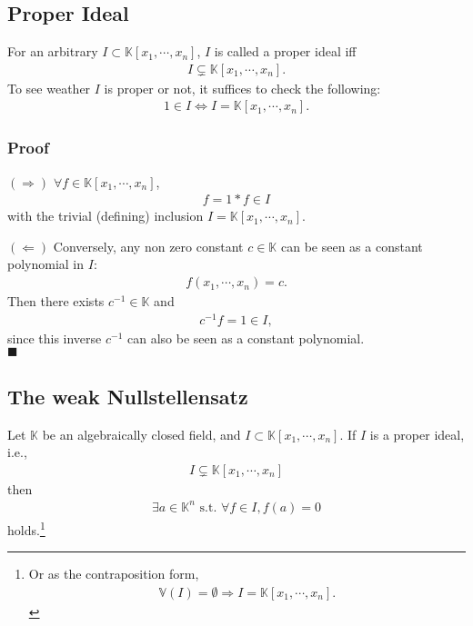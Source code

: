 \documentclass[11pt]{book}
\begin{document}
\subsection{Proper Ideal}
For an arbitrary $I \subset \mathbb{K}[x_1, \cdots, x_n]$, $I$ is called a proper ideal iff 
\begin{eqnarray}
I \subsetneq \mathbb{K}[x_1, \cdots, x_n].
\end{eqnarray}
To see weather $I$ is proper or not, it suffices to check the following:
\begin{eqnarray}
1 \in I \Leftrightarrow I = \mathbb{K}[x_1, \cdots, x_n].
\end{eqnarray}

\subsubsection{Proof}
$(\Rightarrow)$ $\forall f \in \mathbb{K}[x_1, \cdots, x_n]$,
\begin{eqnarray}
f = 1*f \in I
\end{eqnarray}
with the trivial (defining) inclusion $I = \mathbb{K}[x_1, \cdots, x_n]$.

$(\Leftarrow)$ Conversely, any non zero constant $c \in \mathbb{K}$ can be seen as a constant polynomial in $I$:
\begin{eqnarray}
f(x_1, \cdots, x_n) = c.
\end{eqnarray}
Then there exists $c^{-1} \in \mathbb{K}$ and
\begin{eqnarray}
c^{-1} f = 1 \in I,
\end{eqnarray}
since this inverse $c^{-1}$ can also be seen as a constant polynomial.\\
$\blacksquare$

\subsection{The weak Nullstellensatz}
Let $\mathbb{K}$ be an algebraically closed field, and $I \subset \mathbb{K}[x_1, \cdots, x_n]$.
If $I$ is a proper ideal, i.e.,
\begin{eqnarray}
I \subsetneq \mathbb{K}[x_1, \cdots, x_n]
\end{eqnarray}
then
\begin{eqnarray}
\exists a \in \mathbb{K}^n \text{ s.t. } \forall f \in I, f(a) = 0
\end{eqnarray}
holds.\footnote{
Or as the contraposition form,
\begin{eqnarray}
\mathbb{V}(I) = \emptyset \Rightarrow I = \mathbb{K}[x_1, \cdots, x_n].
\end{eqnarray}
}
\end{document}
